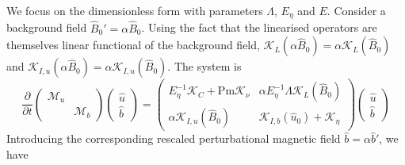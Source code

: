 We focus on the dimensionless form with parameters $\Lambda$, $E_\eta$ and $E$. Consider a background field $\hat{B}_0' = \alpha \hat{B}_0$. Using the fact that the linearised operators are themselves linear functional of the background field, $\mathcal{K}_L(\alpha \hat{B}_0) = \alpha \mathcal{K}_L(\hat{B}_0)$ and $\mathcal{K}_{I,u}(\alpha \hat{B}_0) = \alpha \mathcal{K}_{I,u}(\hat{B}_0)$.
The system is
\[
    \frac{\partial}{\partial t} \begin{pmatrix} \mathcal{M}_u & \\ & \mathcal{M}_b \end{pmatrix}
    \begin{pmatrix} \hat{u} \\ \hat{b} \end{pmatrix} = 
    \begin{pmatrix}
        E_\eta^{-1} \mathcal{K}_C + \mathrm{Pm} \mathcal{K}_\nu & \alpha E_\eta^{-1} \Lambda \mathcal{K}_{L}(\hat{B}_0) \\ 
        \alpha \mathcal{K}_{I,u}(\hat{B}_0) & \mathcal{K}_{I,b}(\hat{u}_0) + \mathcal{K}_\eta
    \end{pmatrix}
    \begin{pmatrix} \hat{u} \\ \hat{b} \end{pmatrix}
\]
Introducing the corresponding rescaled perturbational magnetic field $\hat{b} = \alpha \hat{b}'$, we have 
